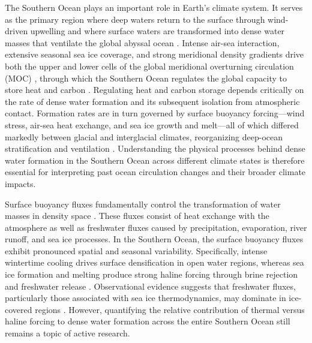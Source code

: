 \documentclass[draft]{agujournal2025}
\begin{document}
The Southern Ocean plays an important role in Earth's climate system. It serves as the primary region where deep waters return to the surface through wind-driven upwelling and where surface waters are transformed into dense water masses that ventilate the global abyssal ocean \cite{Marshall2012,Talley2013}. Intense air-sea interaction, extensive seasonal sea ice coverage, and strong meridional density gradients drive both the upper and lower cells of the global meridional overturning circulation (MOC) \cite{Speer2000,Lumpkin2007}, through which the Southern Ocean regulates the global capacity to store heat and carbon \cite{Marinov2006,Gray2024}. Regulating heat and carbon storage depends critically on the rate of dense water formation and its subsequent isolation from atmospheric contact. Formation rates are in turn governed by surface buoyancy forcing---wind stress, air-sea heat exchange, and sea ice growth and melt---all of which differed markedly between glacial and interglacial climates, reorganizing deep-ocean stratification and ventilation \cite{Adkins2002,Ferrari2014,Jansen2017}. Understanding the physical processes behind dense water formation in the Southern Ocean across different climate states is therefore essential for interpreting past ocean circulation changes and their broader climate impacts.



Surface buoyancy fluxes fundamentally control the transformation of water masses in density space \cite{Walin1982,Speer1992,drake2025water}. These fluxes consist of heat exchange with the atmosphere as well as freshwater fluxes caused by precipitation, evaporation, river runoff, and sea ice processes. In the Southern Ocean, the surface buoyancy fluxes exhibit pronounced spatial and seasonal variability. Specifically, intense wintertime cooling drives surface densification in open water regions, whereas sea ice formation and melting produce strong haline forcing through brine rejection and freshwater release \cite{Abernathey2016,Pellichero2018}. Observational evidence suggests that freshwater fluxes, particularly those associated with sea ice thermodynamics, may dominate in ice-covered regions \cite{Pellichero2018,Bailey2023}. However, quantifying the relative contribution of thermal versus haline forcing to dense water formation across the entire Southern Ocean still remains a topic of active research.
\end{document}
